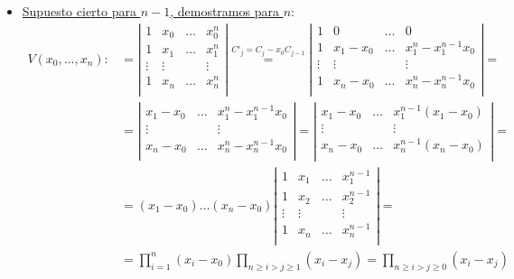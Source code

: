 \begin{ejercicio}
\begin{itemize}
        \item \underline{Supuesto cierto para $n-1$, demostramos para $n$}:
        \begin{equation*}\begin{split}
            V(x_0, \dots, x_n):&= \left|
            \begin{array}{cccc}
                1 & x_0 & \dots & x_0^n \\
                1 & x_1 & \dots & x_1^n \\
                \vdots & \vdots &  & \vdots \\
                1 & x_n & \dots & x_n^n \\
            \end{array}\right|
            \stackrel{C'_j = C_j -x_0C_{j-1}}{=}
             \left| \begin{array}{cccc}
                1 & 0 & \dots & 0 \\
                1 & x_1-x_0 & \dots & x_1^n-x_1^{n-1}x_0 \\
                \vdots & \vdots &  & \vdots \\
                1 & x_n-x_0 & \dots & x_n^n-x_n^{n-1}x_0 \\
            \end{array}\right|
            =\\&=
            \left| \begin{array}{ccc}
                x_1-x_0 & \dots & x_1^n-x_1^{n-1}x_0 \\
                \vdots &  & \vdots \\
                x_n-x_0 & \dots & x_n^n-x_n^{n-1}x_0 \\
            \end{array}\right|
            =
            \left| \begin{array}{ccc}
                x_1-x_0 & \dots & x_1^{n-1}(x_1-x_0) \\
                \vdots &  & \vdots \\
                x_n-x_0 & \dots & x_n^{n-1}(x_n-x_0) \\
            \end{array}\right|
            =\\&=
            (x_1-x_0)\dots(x_n-x_0)
            \left|\begin{array}{cccc}
                1 & x_1 & \dots & x_1^{n-1} \\
                1 & x_2 & \dots & x_2^{n-1} \\
                \vdots & \vdots &  & \vdots \\
                1 & x_n & \dots & x_n^{n-1} \\
            \end{array}\right|
            =\\&=
            \prod_{i=1}^n (x_i-x_0) \prod_{n\geq i>j\geq 1}(x_i - x_j)
            = \prod_{n\geq i>j\geq 0}(x_i - x_j)
        \end{split}\end{equation*}


\end{itemize}
\end{ejercicio}
